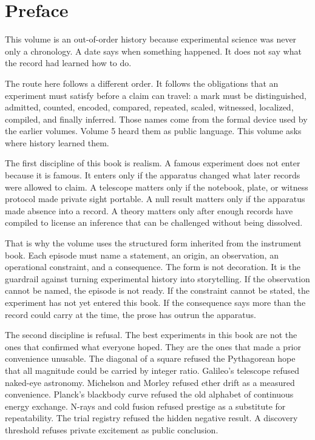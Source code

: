 \chapter*{Preface}

This volume is an out-of-order history because experimental science was never
only a chronology. A date says when something happened. It does not say what
the record had learned how to do.

The route here follows a different order. It follows the obligations that an
experiment must satisfy before a claim can travel: a mark must be distinguished,
admitted, counted, encoded, compared, repeated, scaled, witnessed, localized,
compiled, and finally inferred. Those names come from the formal device used by
the earlier volumes. Volume 5 heard them as public language. This volume asks
where history learned them.

The first discipline of this book is realism. A famous experiment does not
enter because it is famous. It enters only if the apparatus changed what later
records were allowed to claim. A telescope matters only if the notebook, plate,
or witness protocol made private sight portable. A null result matters only if
the apparatus made absence into a record. A theory matters only after enough
records have compiled to license an inference that can be challenged without
being dissolved.

That is why the volume uses the structured  form inherited from
the instrument book. Each episode must name a statement, an origin, an
observation, an operational constraint, and a consequence. The form is not
decoration. It is the guardrail against turning experimental history into
storytelling. If the observation cannot be named, the episode is not ready. If
the constraint cannot be stated, the experiment has not yet entered this book.
If the consequence says more than the record could carry at the time, the prose
has outrun the apparatus.

The second discipline is refusal. The best experiments in this book are not the
ones that confirmed what everyone hoped. They are the ones that made a prior
convenience unusable. The diagonal of a square refused the Pythagorean hope
that all magnitude could be carried by integer ratio. Galileo's telescope
refused naked-eye astronomy. Michelson and Morley refused ether drift as a
measured convenience. Planck's blackbody curve refused the old alphabet of
continuous energy exchange. N-rays and cold fusion refused prestige as a
substitute for repeatability. The trial registry refused the hidden negative
result. A discovery threshold refuses private excitement as public conclusion.

